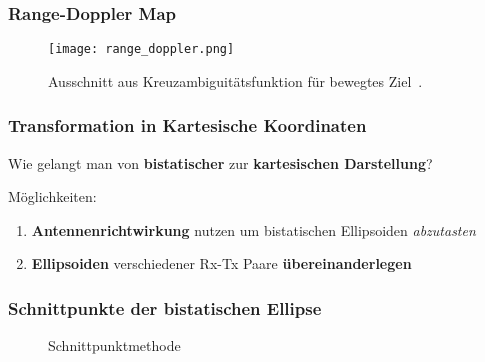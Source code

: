 \begin{frame}
    \frametitle{Range-Doppler Map}

    \begin{figure}
        \centering
        \texttt{[image: range\_doppler.png]}
        \caption{Ausschnitt aus Kreuzambiguitätsfunktion für bewegtes Ziel~\cite[p.~161]{Malanowski2019}.}
    \end{figure}
\end{frame}

\begin{frame}
    \frametitle{Transformation in Kartesische Koordinaten}

    \Large Wie gelangt man von \textbf{bistatischer} zur \textbf{kartesischen Darstellung}?\normalsize

    \vspace{2\baselineskip}

    Möglichkeiten:
    \begin{enumerate}
        \item \textbf{Antennenrichtwirkung} nutzen um bistatischen Ellipsoiden \emph{abzutasten}
        \item \textbf{Ellipsoiden} verschiedener Rx-Tx Paare \textbf{übereinanderlegen}
    \end{enumerate}
\end{frame}


\begin{frame}
    \frametitle{Schnittpunkte der bistatischen Ellipse}

    \begin{figure}
        \centering
        \begin{adjustbox}{max width=\linewidth,totalheight=\baselineskip}
            \begin{tikzpicture}
                
            \end{tikzpicture}
        \end{adjustbox}
        \caption{Schnittpunktmethode}
    \end{figure}
\end{frame}
